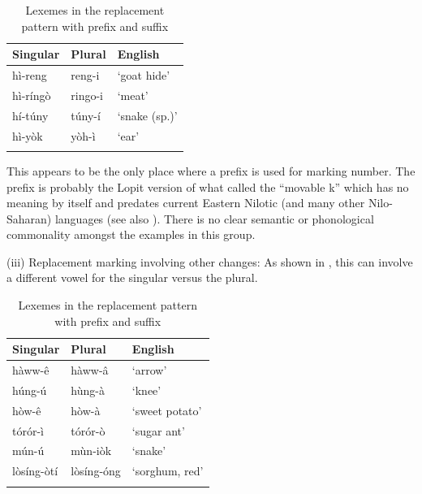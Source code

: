 \documentclass[output=paper]{langsci/langscibook}
\begin{document}
\begin{table}

\begin{tabularx}{\textwidth}{XXX}
\lsptoprule

 \textbf{Singular} & \textbf{Plural} & \textbf{English}\\ \midrule
 h\`{i}-reng &  reng-i & ‘goat hide’\\
 h\`{i}-r\'{i}ng\`{o} &  ringo-i & ‘meat’\\
 h\'{i}-t\'{u}ny &  t\'{u}ny-\'{i} & ‘snake (sp.)’\\
 h\`{i}-y\`{o}k &  y\`{o}h-\`{i} & ‘ear’\\
\lspbottomrule
\end{tabularx}
\caption{Lexemes in the replacement pattern with prefix and suffix}
\label{tab:moodie:15}
\end{table}

This appears to be the only place where a prefix is used for marking number. The prefix is probably the Lopit version of what \citet{Greenberg1981} called the “movable k” which has no meaning by itself and predates current Eastern Nilotic (and many other Nilo-Saharan) languages (see also \citealt[251]{Dimmendaal1983}). There is no clear semantic or phonological commonality amongst the examples in this group.

(iii) Replacement marking involving other changes: As shown in , this can involve a different vowel for the singular versus the plural.

\begin{table}

\begin{tabularx}{\textwidth}{XXX}
\lsptoprule

 \textbf{Singular} & \textbf{Plural} & \textbf{English}\\ \midrule
 h\`{a}ww-\^{e} &  h\`{a}ww-\^{a} & ‘arrow’\\
 h\'{u}ng-\'{u} &  h\`{u}ng-\`{a} & ‘knee’\\
 h\`{o}w-\^{e} &  h\`{o}w-\`{a} & ‘sweet potato’\\
 t\'{o}r\'{o}r-\`{i} &  t\'{o}r\'{o}r-\`{o} & ‘sugar ant’\\
 m\'{u}n-\'{u} &  m\`{u}n-i\`{o}k & ‘snake’\\
 l\`{o}s\'{i}ng-\`{o}t\'{i} &  l\`{o}s\'{i}ng-\'{o}ng & ‘sorghum, red’\\
\lspbottomrule
\end{tabularx}
\caption{Lexemes in the replacement pattern with prefix and suffix}
\label{tab:moodie:16}
\end{table}
\end{document}
